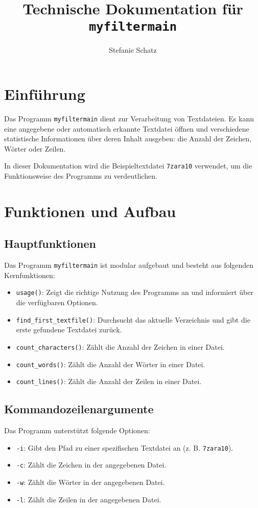 \documentclass[10pt]{article} %
\title{Technische Dokumentation für \texttt{myfiltermain}}
\author{Stefanie Schatz}
\date{} %
\begin{document}
\maketitle

\section{Einführung}
Das Programm \texttt{myfiltermain} dient zur Verarbeitung von Textdateien. Es kann eine angegebene oder automatisch erkannte Textdatei öffnen und verschiedene statistische Informationen über deren Inhalt ausgeben: die Anzahl der Zeichen, Wörter oder Zeilen. 

In dieser Dokumentation wird die Beispieltextdatei \texttt{7zara10} verwendet, um die Funktionsweise des Programms zu verdeutlichen.

\section{Funktionen und Aufbau}
\subsection{Hauptfunktionen}
Das Programm \texttt{myfiltermain} ist modular aufgebaut und besteht aus folgenden Kernfunktionen:
\begin{itemize}
    \item \texttt{usage()}: Zeigt die richtige Nutzung des Programms an und informiert über die verfügbaren Optionen.
    \item \texttt{find\_first\_textfile()}: Durchsucht das aktuelle Verzeichnis und gibt die erste gefundene Textdatei zurück.
    \item \texttt{count\_characters()}: Zählt die Anzahl der Zeichen in einer Datei.
    \item \texttt{count\_words()}: Zählt die Anzahl der Wörter in einer Datei.
    \item \texttt{count\_lines()}: Zählt die Anzahl der Zeilen in einer Datei.
\end{itemize}

\subsection{Kommandozeilenargumente}
Das Programm unterstützt folgende Optionen:
\begin{itemize}
    \item \texttt{-i}: Gibt den Pfad zu einer spezifischen Textdatei an (z. B. \texttt{7zara10}).
    \item \texttt{-c}: Zählt die Zeichen in der angegebenen Datei.
    \item \texttt{-w}: Zählt die Wörter in der angegebenen Datei.
    \item \texttt{-l}: Zählt die Zeilen in der angegebenen Datei.
\end{itemize}
\end{document}
